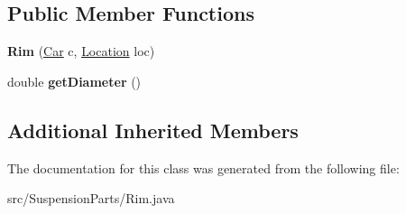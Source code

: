 \subsection*{Public Member Functions}
\begin{DoxyCompactItemize}
\item 
\hypertarget{classSuspensionParts_1_1Rim_a33de015026dde99b8082aa7a8387d60c}{}{\bfseries Rim} (\hyperlink{classCars_1_1Car}{Car} c, \hyperlink{enumEnums_1_1Location}{Location} loc)\label{classSuspensionParts_1_1Rim_a33de015026dde99b8082aa7a8387d60c}

\item 
\hypertarget{classSuspensionParts_1_1Rim_aac9a8947c36ab59e02633464cc059ab0}{}double {\bfseries get\+Diameter} ()\label{classSuspensionParts_1_1Rim_aac9a8947c36ab59e02633464cc059ab0}

\end{DoxyCompactItemize}
\subsection*{Additional Inherited Members}


The documentation for this class was generated from the following file\+:\begin{DoxyCompactItemize}
\item 
src/\+Suspension\+Parts/Rim.\+java\end{DoxyCompactItemize}
